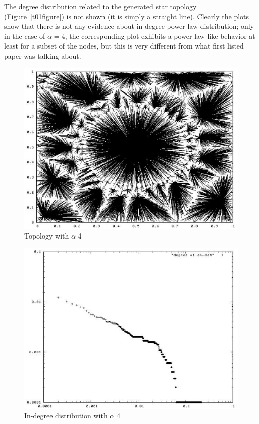 \documentclass[a4paper,12pt]{article}
\begin{document}
The degree distribution related to the generated star topology 
(Figure~\ref{t01figure}) is not 
shown (it is simply a straight line).
Clearly the plots show that there is not any evidence about in-degree 
power-law distribution; only in the case of $\alpha = 4$, the corresponding 
plot exhibits a power-law like behavior at least for a subset of the nodes, 
but this is very different from what first listed paper was talking about.

\begin{figure}[tb!]
\begin{center}
\includegraphics[scale=0.6]{pic_alfa4.eps}
\end{center}
\caption{Topology with $\alpha$ 4\label{t4figure}}
\end{figure}

\begin{figure}[tb!]
\begin{center}
\includegraphics[scale=0.6]{picdegree_alfa4.eps}
\end{center}
\caption{In-degree distribution with $\alpha$ 4 \label{d4figure}}
\end{figure}
\end{document}
